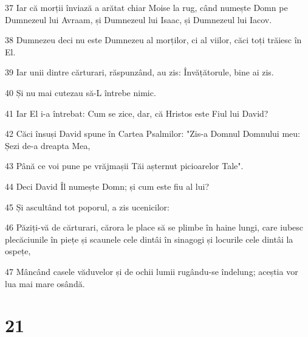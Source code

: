 \par 37 Iar că morții înviază a arătat chiar Moise la rug, când numește Domn pe Dumnezeul lui Avraam, și Dumnezeul lui Isaac, și Dumnezeul lui Iacov.
\par 38 Dumnezeu deci nu este Dumnezeu al morților, ci al viilor, căci toți trăiesc în El.
\par 39 Iar unii dintre cărturari, răspunzând, au zis: Învățătorule, bine ai zis.
\par 40 Și nu mai cutezau să-L întrebe nimic.
\par 41 Iar El i-a întrebat: Cum se zice, dar, că Hristos este Fiul lui David?
\par 42 Căci însuși David spune în Cartea Psalmilor: "Zis-a Domnul Domnului meu: Șezi de-a dreapta Mea,
\par 43 Până ce voi pune pe vrăjmașii Tăi așternut picioarelor Tale".
\par 44 Deci David Îl numește Domn; și cum este fiu al lui?
\par 45 Și ascultând tot poporul, a zis ucenicilor:
\par 46 Păziți-vă de cărturari, cărora le place să se plimbe în haine lungi, care iubesc plecăciunile în piețe și scaunele cele dintâi în sinagogi și locurile cele dintâi la ospețe,
\par 47 Mâncând casele văduvelor și de ochii lumii rugându-se îndelung; aceștia vor lua mai mare osândă.

\chapter{21}

